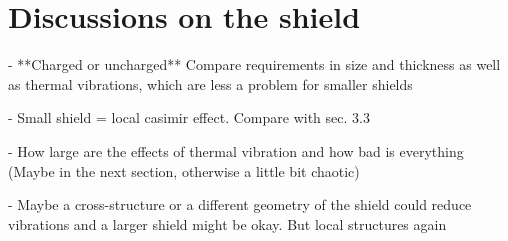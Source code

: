 \section{Discussions on the shield} \label{sec:4:discussion}

- **Charged or uncharged**
Compare requirements in size and thickness as well as thermal vibrations, which are less a problem for smaller shields

- Small shield = local casimir effect. Compare with sec. 3.3

- How large are the effects of thermal vibration and how bad is everything
(Maybe in the next section, otherwise a little bit chaotic)

- Maybe a cross-structure or a different geometry of the shield could reduce vibrations and a larger shield might be okay. But local structures again